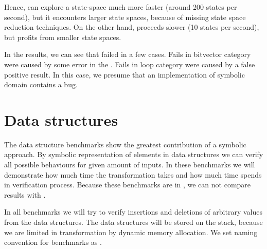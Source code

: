 Hence, \SymDIVINE can explore a state-space much more faster (around 200 states
per second), but it encounters larger state spaces, because of missing state
space reduction techniques. On the other hand, \DIVINE proceeds slower (10
states per second), but profits from smaller state spaces.

In the results, we can see that \DIVINE failed in a few cases. Fails in
bitvector category were caused by some error in the \DIVINE. Fails in loop
category were caused by a false positive result. In this case, we presume that
an implementation of symbolic domain contains a bug.



\section{Data structures}

The data structure benchmarks show the greatest contribution of a symbolic
approach. By symbolic representation of elements in data structures we can
verify all possible behaviours for given amount of inputs. In these benchmarks
we will demonstrate how much time the transformation takes and how much time
\DIVINE spends in verification process. Because these benchmarks are in \Cpp, we
can not compare results with \SymDIVINE.

In all benchmarks we will try to verify insertions and deletions of arbitrary
values from the data structures. The data structures will be stored on the
stack, because we are limited in transformation by dynamic memory allocation.
We set naming convention for benchmarks as .

